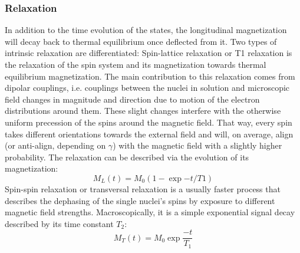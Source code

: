         \subsubsection{Relaxation}
        In addition to the time evolution of the states, the longitudinal magnetization will decay back to thermal equilibrium once deflected from it. Two types of intrinsic relaxation are differentiated:
        Spin-lattice relaxation or T1 relaxation is the relaxation of the spin system and its magnetization towards thermal equilibrium magnetization. The main contribution to this relaxation comes from dipolar couplings, i.e. couplings between the nuclei in solution and microscopic field changes in magnitude and direction due to motion of the electron distributions around them. These slight changes interfere with the otherwise uniform precession of the spins around the magnetic field. That way, every spin takes different orientations towards the external field and will, on average, align (or anti-align, depending on $\gamma$) with the magnetic field with a slightly higher probability. The relaxation can be described via the evolution of its magnetization:
        \begin{equation}
            M_L(t) = M_0(1 - \exp{-t/T1})
        \end{equation}
        Spin-spin relaxation or transversal relaxation is a usually faster process that describes the dephasing of the single nuclei's spins by exposure to different magnetic field strengths. Macroscopically, it is a simple exponential signal decay described by its time constant $T_2$:
        \begin{equation}
            M_T(t) = M_0\exp{\frac{-t}{T_1}}
        \end{equation}
